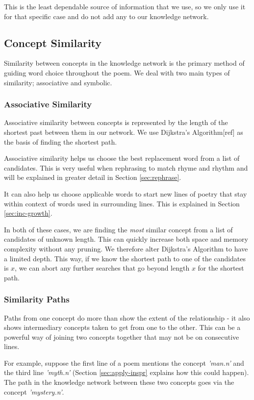 This is the least dependable source of information that we use, so we only use it for that specific case and do not add any to our knowledge network.


\subsection{Concept Similarity}
Similarity between concepts in the knowledge network is the primary method of guiding word choice throughout the poem. We deal with two main types of similarity; associative and symbolic.

\subsubsection{Associative Similarity}
\label{sec:assoc-sim}
Associative similarity between concepts is represented by the length of the shortest past between them in our network. We use Dijkstra's Algorithm[ref] as the basis of finding the shortest path.

Associative similarity helps us choose the best replacement word from a list of candidates. This is very useful when rephrasing to match rhyme and rhythm and will be explained in greater detail in Section \ref{sec:rephrase}. 

It can also help us choose applicable words to start new lines of poetry that stay within context of words used in surrounding lines. This is explained in Section \ref{sec:inc-growth}.

In both of these cases, we are finding the \textit{most} similar concept from a list of candidates of unknown length. This can quickly increase both space and memory complexity without any pruning. We therefore alter Dijkstra's Algorithm to have a limited depth. This way, if we know the shortest path to one of the candidates is $x$, we can abort any further searches that go beyond length $x$ for the shortest path.

\subsubsection{Similarity Paths}
Paths from one concept do more than show the extent of the relationship - it also shows intermediary concepts taken to get from one to the other. This can be a powerful way of joining two concepts together that may not be on consecutive lines.

For example, suppose the first line of a poem mentions the concept \textit{'man.n'} and the third line \textit{'myth.n'} (Section \ref{sec:apply-inspr} explains how this could happen). The path in the knowledge network between these two concepts goes via the concept \textit{'mystery.n'}.


